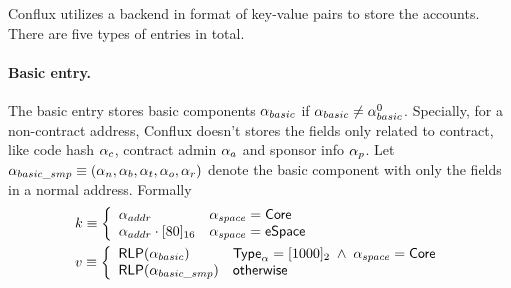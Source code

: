 Conflux utilizes a backend in format of key-value pairs to store the accounts. There are five types of entries in total. 

\paragraph{Basic entry.} The basic entry stores basic components $\mathbf{\alpha}_{basic}$ if $\mathbf{\alpha}_{basic}\neq \mathbf{\alpha}^0_{basic}$. Specially, for a non-contract address, Conflux doesn't stores the fields only related to contract, like code hash $\mathbf{\alpha}_c$, contract admin $\mathbf{\alpha}_a$ and sponsor info $\mathbf{\alpha}_p$. Let $\mathbf{\alpha}_{basic\_smp}\equiv (\mathbf{\alpha}_n, \mathbf{\alpha}_b, \mathbf{\alpha}_t, \mathbf{\alpha}_o, \mathbf{\alpha}_r)$ denote the basic component with only the fields in a normal address. Formally
\begin{align}
	&k\equiv \left\{\begin{array}{ll}
		\alpha_{addr} & \mathbf{\alpha}_{space}=\mathsf{Core} \\
		\alpha_{addr}\cdot [80]_{16} & \mathbf{\alpha}_{space}=\mathsf{eSpace}
	\end{array}\right.\\
	&v\equiv \left\{\begin{array}{ll}
		\mathsf{RLP}(\mathbf{\alpha}_{basic}) & \mathsf{Type}_\alpha=[1000]_2\;\wedge\;\mathbf{\alpha}_{space}=\mathsf{Core} \\
		\mathsf{RLP}(\mathbf{\alpha}_{basic\_smp}) & \mathsf{otherwise}
	\end{array}\right.
\end{align}
	
	

